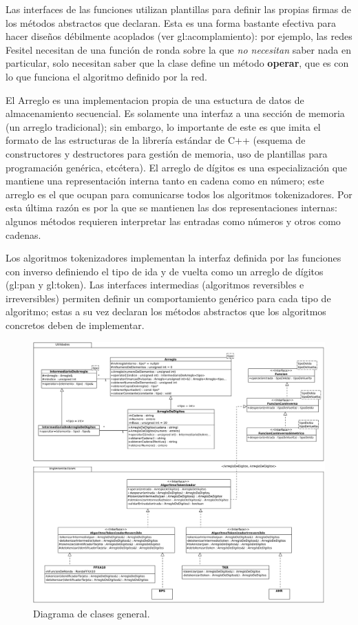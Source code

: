Las interfaces de las funciones utilizan plantillas para definir las propias
firmas de los métodos abstractos que declaran. Esta es una forma bastante
efectiva para hacer diseños débilmente acoplados (ver
\gls{gl:acomplamiento}): por ejemplo, las redes Fesitel necesitan
de una función de ronda sobre la que \textit{no necesitan} saber nada en
particular, solo necesitan saber que la clase define un método \textbf{operar},
que es con lo que funciona el algoritmo definido por la red.

El Arreglo es una implementacion propia de una estuctura de datos de
almacenamiento secuencial. Es solamente una interfaz a una sección
de memoria (un arreglo tradicional); sin embargo, lo importante de este es
que imita el formato de las estructuras de la librería estándar de C++
(esquema de constructores y destructores para gestión de memoria, uso
de plantillas para programación genérica, etcétera). El arreglo de dígitos es
una especialización que mantiene una representación interna tanto en cadena como
en número; este arreglo es el que ocupan para comunicarse todos los
algoritmos tokenizadores. Por esta última razón es por la que se
mantienen las dos representaciones internas: algunos métodos requieren
interpretar las entradas como números y otros como cadenas.

Los algoritmos tokenizadores implementan la interfaz definida por las
funciones con inverso definiendo el tipo de ida y de vuelta como un
arreglo de dígitos (\gls{gl:pan} y \gls{gl:token}). Las interfaces intermedias
(algoritmos reversibles e irreversibles) permiten definir un comportamiento
genérico para cada tipo de algoritmo; estas a su vez declaran los métodos
abstractos que los algoritmos concretos deben de implementar.

\begin{figure}
  \begin{center}
    \includegraphics[width=1.0\linewidth]{diagramas/diagrama_general.png}
    \caption{Diagrama de clases general.}
    \label{clases_general}
  \end{center}
\end{figure}

